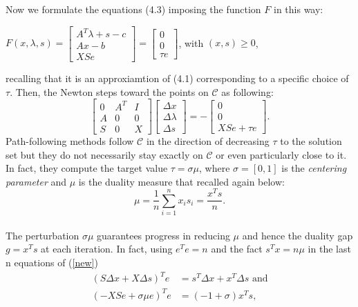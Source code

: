 \documentclass[a4paper,10 pt,titlepage,twoside]{book}
\theoremstyle{plain}
\theoremstyle{definition}
\theoremstyle{remark}
\begin{document}
 Now we formulate the equations (4.3) imposing the function $\mathit{F}$ in this way:
 \begin{center}
 	$\mathit{F}(x,\lambda,s)= \begin{bmatrix}
 	A^{T}\lambda+s-c \\Ax-b \\XSe
 	\end{bmatrix}=\begin{bmatrix} 0\\0\\ \tau e \end{bmatrix}$, with $(x,s)\geq0$,
 \end{center}
recalling that it is an approxiamtion of (4.1) corresponding
to a specific choice of $\tau$. Then, the Newton steps toward the points on $\mathcal{C}$ as following:
 \begin{equation}\label{new}\tag{4.5}
 \begin{bmatrix}
 0&A^{T}&I \\A&0&0\\S&0&X
 \end{bmatrix}\begin{bmatrix}
 \Delta x\\\Delta\lambda \\\Delta s
 \end{bmatrix}=-\begin{bmatrix}
 0\\0\\XSe + \tau e
 \end{bmatrix}.
 \end{equation}
 Path-following methods follow $\mathcal{C}$ in the direction of decreasing $\tau$ to the solution set but they do not necessarily stay exactly on $\mathcal{C}$ or even particularly close to it. In fact, they compute the target value $\tau = \sigma \mu$, where $\sigma = [0,1]$ is the \textit{centering parameter} and $\mu$ is the duality measure that recalled again below:
 \begin{equation}\label{eq:dm}\tag{4.6}
 \mu = \frac{1}{n}\sum_{i=1}^{n} x_{i}s_{i} = \frac{x^{T}s}{n}.
 \end{equation}\\
 The perturbation $\sigma\mu$ guarantees progress in reducing $\mu$ and hence the duality gap $g = x^{T}s$ at each iteration.
In fact, using $e^{T}e= n$ and the fact $s^{T}x=n\mu$ in the last n equations of (\ref{new})
 \begin{align*}
 (S\Delta x + X\Delta s)^{T}e &= s^{T}\Delta x + x^{T}\Delta s \text{ and}\\
  (- XSe + \sigma \mu e)^{T}e &= (-1 + \sigma)x^{T}s,
 \end{align*}
\end{document}
